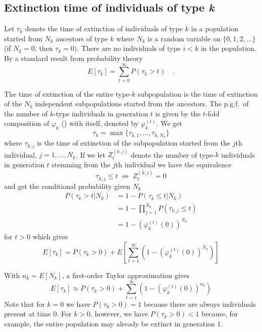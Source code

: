 \documentclass[9pt,lineno]{elife}
\begin{document}
\subsection{Extinction time of individuals of type \emph{k}}


Let $\tau_k$ denote the time of extinction of individuals of type $k$ in a population started from $N_{k}$ ancestors of type $k$ where $N_k$ is a random variable on $\{0,1,2,...\}$ (if $N_k=0$, then $\tau_k=0$).  
There are no individuals of type $i < k$ in the population.
By a standard result from probability theory
%
\begin{equation*}
E[\tau_k]=\sum_{t=0}^{\infty}P(\tau_k>t) \quad .
\end{equation*}

The time of extinction of the entire type-$k$ subpopulation is the time of extinction of the $N_{k}$ independent subpopulations started from the ancestors. The p.g.f.\ of the number of $k$-type individuals in generation $t$ is given by the $t$-fold composition of $\varphi_k$ () with itself, denoted by $\varphi^{(t)}_k$. We get
%
$$\tau_{k}=\max\{\tau_{k,1},...,\tau_{k,N_{k}}\}$$
%
where $\tau_{k,j}$ is the time of extinction of the subpopulation started from the $j$th individual, $j=1,...,N_k$. If we let $Z_{t}^{(k,j)}$ denote the number of type-$k$ individuals in generation $t$ stemming from the $j$th individual we have the equivalence 
%
\begin{equation*}
\tau_{k,j}\leq t \; \Leftrightarrow \; Z_{t}^{(k,j)}=0
\end{equation*}
%
and get the conditional probability given $N_k$
%
\begin{align*}
%
P(\tau_{k}>t|N_k) & =  1-P(\tau_{k}\leq t|N_k)\\[3pt]
           & =  1-\prod_{j=1}^{N_{k}}P(\tau_{k,j}\leq t)\\[3pt]
           & =  1-\left(\varphi_{k}^{(t)}(0)\right)^{N_{k}}
\end{align*}
%
for $t>0$ which gives 
%
\begin{equation*}
%
E[\tau_{k}] = P(\tau_{k}>0) + E\left[\sum_{t=1}^{\infty}\left(1-\left(\varphi_{k}^{(t)}(0)\right)^{N_{k}}\right)\right]
%
\end{equation*}

With $n_k=E[N_k]$, a first-order Taylor approximation gives 
%
\begin{equation}
%
E[\tau_{k}] \approx P(\tau_{k}>0) + \sum_{t=1}^{\infty}\left(1-\left(\varphi_{k}^{(t)}(0)\right)^{n_{k}}\right)
%
\label{eq:tauk}
\end{equation}
%
Note that for $k=0$ we have $P(\tau_{0}>0)=1$ because there are always individuals present at time $0$. For $k>0$, however, we have $P(\tau_{k}>0)<1$ because, for example, 
the entire population may already be extinct
in generation 1. 
\end{document}

